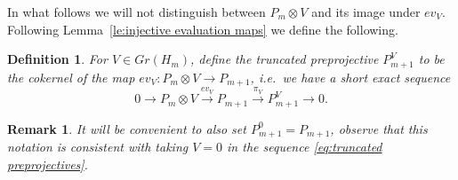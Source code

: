 \documentclass{amsart}
\newtheorem{definition}[theorem]{Definition}
\newtheorem{lemma}[theorem]{Lemma}
\newtheorem{remark}[theorem]{Remark}
\newcommand{\CC}{\mathbb{C}}
\begin{document}
In what follows we will not distinguish between $P_m\otimes V$ and its image under $ev_V$.
Following Lemma~\ref{le:injective evaluation maps} we define the following.
\begin{definition}
  For $V\in Gr(H_m)$, define the \emph{truncated preprojective} $P_{m+1}^V$ to be the cokernel of the map $ev_V:P_m\otimes V\to P_{m+1}$, i.e.\ we have a short exact sequence
  \begin{equation}
    \label{eq:truncated preprojectives}
    0\longrightarrow P_m\otimes V\stackrel{ev_V}{\longrightarrow} P_{m+1}\stackrel{\pi_V}{\longrightarrow} P_{m+1}^V\longrightarrow 0.
  \end{equation}
\end{definition}
\begin{remark}
  It will be convenient to also set $P_{m+1}^0=P_{m+1}$, observe that this notation is consistent with taking $V=0$ in the sequence \eqref{eq:truncated preprojectives}.
\end{remark}
\end{document}
